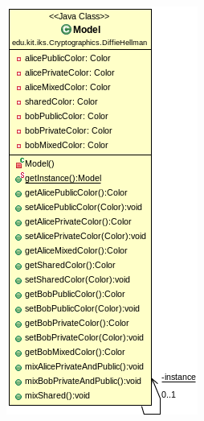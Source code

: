 \documentclass{article}
\begin{document}
      \begin{figure}[H]
        \centering
        \includegraphics[width=\textwidth]{resources/edu-kit-iks-Cryptographics-DiffieHellman-Model}
      \end{figure}
\end{document}
